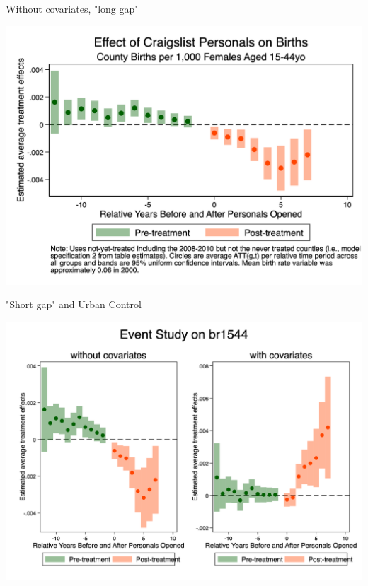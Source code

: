 \documentclass{beamer}
\begin{document}
\begin{frame}{Without covariates, "long gap"}


    \begin{center}
        \includegraphics[width=0.75\linewidth,keepaspectratio]{./lecture_includes/es_births2.png}
    \end{center}
\end{frame}

\begin{frame}{"Short gap" and Urban Control}


    \begin{center}
        \includegraphics[width=0.75\linewidth,keepaspectratio]{./lecture_includes/es_br1544_combined.png}
    \end{center}
\end{frame}
\end{document}
